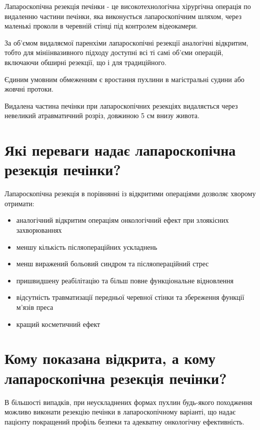 Лапароскопічна резекція печінки - це високотехнологічна хірургічна операція по видаленню частини печінки, яка виконується лапароскопічним шляхом, через маленькі проколи в черевній стінці під контролем відеокамери. 

\begin{tcolorbox}[width=\textwidth,colback=yellow!5!white,colframe=yellow!75!black]    
За об’ємом видаляємої паренхіми лапароскопічні резекції аналогічні відкритим, тобто для мініінвазивного підходу доступні всі ті самі об’єми операцій, включаючи обширні резекції, що і для традиційного.
\end{tcolorbox}    

Єдиним умовним обмеженням є вростання пухлини в магістральні судини або жовчні протоки.

Видалена частина печінки при лапароскопічних резекціях видаляється через невеликий атравматичний розріз, довжиною 5 см внизу живота.


\section{Які переваги надає лапароскопічна резекція печінки?}


Лапароскопічна резекція в порівнянні із відкритими операціями дозволяє хворому отримати:
\begin{itemize}
    \item аналогічний відкритим операціям онкологічний ефект при злоякісних захворюваннях
    \item меншу кількість післяопераційних ускладнень
    \item менш виражений больовий синдром та післяопераційний стрес
    \item пришвидшену реабілітацію та більш повне функціональне відновлення
    \item відсутність травматизації передньої черевної стінки та збереження функції м’язів преса
    \item кращий косметичний ефект
\end{itemize}
	

\section{Кому показана відкрита, а кому лапароскопічна резекція печінки?}

\begin{tcolorbox}[width=\textwidth,colback=green!5!white,colframe=green!75!black]    
В більшості випадків, при неускладнених формах пухлин будь-якого походження можливо виконати резекцію печінки в лапароскопічному варіанті, що надає пацієнту покращений профіль безпеки та адекватну онкологічну ефективність.
\end{tcolorbox}    

